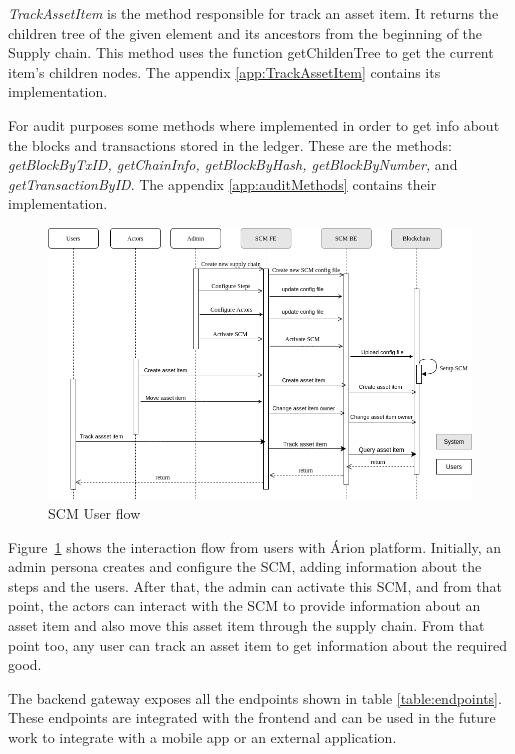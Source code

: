 \textit{TrackAssetItem} is the method responsible for track an asset item. It returns the children tree of the given element and its ancestors from the beginning of the Supply chain. This method uses the function getChildenTree to get the current item's children nodes. The appendix \ref{app:TrackAssetItem} contains its implementation.

For audit purposes some methods where implemented in order to get info about the blocks and transactions stored in the ledger. These are the methods: \textit{getBlockByTxID, getChainInfo, getBlockByHash, getBlockByNumber,} and \textit{getTransactionByID}. The appendix \ref{app:auditMethods} contains their implementation.

\begin{figure}[ht]
\begin{center}
  \includegraphics[scale=0.5]{images/SequenceDiagram.png}
\caption{SCM User flow}
\label{fig:sequenceDiagram}
\end{center}
\end{figure}

Figure~\ref{fig:sequenceDiagram} shows the interaction flow from users with Árion platform. Initially, an admin persona creates and configure the SCM, adding information about the steps and the users. After that, the admin can activate this SCM, and from that point, the actors can interact with the SCM to provide information about an asset item and also move this asset item through the supply chain. From that point too, any user can track an asset item to get information about the required good.

The backend gateway exposes all the endpoints shown in table \ref{table:endpoints}. These endpoints are integrated with the frontend and can be used in the future work to integrate with a mobile app or an external application.


